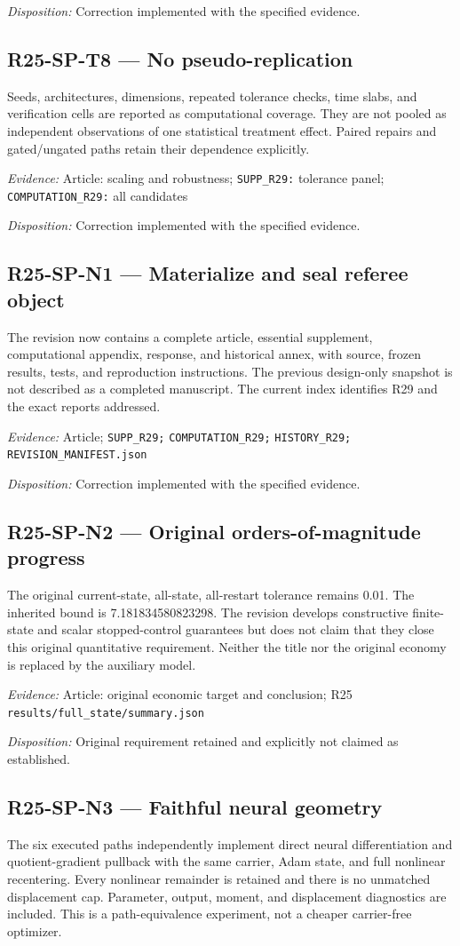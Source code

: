 \emph{Disposition:} Correction implemented with the specified evidence.
\subsection{R25-SP-T8 --- No pseudo-replication}
Seeds, architectures, dimensions, repeated tolerance checks, time slabs, and verification cells are reported as computational coverage. They are not pooled as independent observations of one statistical treatment effect. Paired repairs and gated/ungated paths retain their dependence explicitly.

\emph{Evidence:} Article: scaling and robustness; \nolinkurl{SUPP_R29:} tolerance panel; \nolinkurl{COMPUTATION_R29:} all candidates

\emph{Disposition:} Correction implemented with the specified evidence.
\subsection{R25-SP-N1 --- Materialize and seal referee object}
The revision now contains a complete article, essential supplement, computational appendix, response, and historical annex, with source, frozen results, tests, and reproduction instructions. The previous design-only snapshot is not described as a completed manuscript. The current index identifies R29 and the exact reports addressed.

\emph{Evidence:} Article; \nolinkurl{SUPP_R29;} \nolinkurl{COMPUTATION_R29;} \nolinkurl{HISTORY_R29;} \nolinkurl{REVISION_MANIFEST.json}

\emph{Disposition:} Correction implemented with the specified evidence.
\subsection{R25-SP-N2 --- Original orders-of-magnitude progress}
The original current-state, all-state, all-restart tolerance remains 0.01. The inherited bound is 7.181834580823298. The revision develops constructive finite-state and scalar stopped-control guarantees but does not claim that they close this original quantitative requirement. Neither the title nor the original economy is replaced by the auxiliary model.

\emph{Evidence:} Article: original economic target and conclusion; R25 \nolinkurl{results/full_state/summary.json}

\emph{Disposition:} Original requirement retained and explicitly not claimed as established.
\subsection{R25-SP-N3 --- Faithful neural geometry}
The six executed paths independently implement direct neural differentiation and quotient-gradient pullback with the same carrier, Adam state, and full nonlinear recentering. Every nonlinear remainder is retained and there is no unmatched displacement cap. Parameter, output, moment, and displacement diagnostics are included. This is a path-equivalence experiment, not a cheaper carrier-free optimizer.

